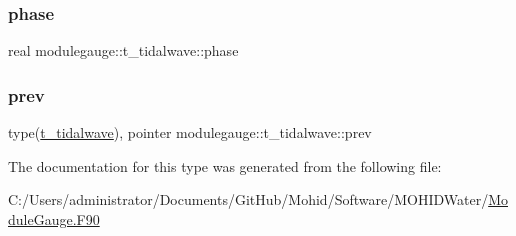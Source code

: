 \subsubsection{\texorpdfstring{phase}{phase}}
{\footnotesize\ttfamily real modulegauge\+::t\+\_\+tidalwave\+::phase\hspace{0.3cm}{\ttfamily [private]}}

\mbox{\label{structmodulegauge_1_1t__tidalwave_a291e7ea297c53005a6b3edf55cbe0a0c}} 
\subsubsection{\texorpdfstring{prev}{prev}}
{\footnotesize\ttfamily type(\mbox{\hyperlink{structmodulegauge_1_1t__tidalwave}{t\+\_\+tidalwave}}), pointer modulegauge\+::t\+\_\+tidalwave\+::prev\hspace{0.3cm}{\ttfamily [private]}}



The documentation for this type was generated from the following file\+:\begin{DoxyCompactItemize}
\item 
C\+:/\+Users/administrator/\+Documents/\+Git\+Hub/\+Mohid/\+Software/\+M\+O\+H\+I\+D\+Water/\mbox{\hyperlink{_module_gauge_8_f90}{Module\+Gauge.\+F90}}\end{DoxyCompactItemize}
